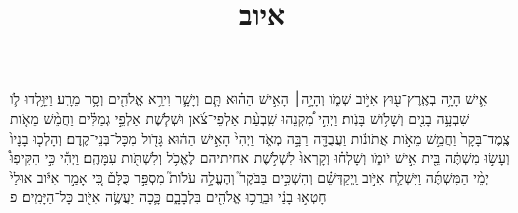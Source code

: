 \documentclass{openreader}
\title{איוב}
\date{}
\begin{document}
\maketitle
\raggedbottom 
\fontsize{16pt}{24pt}\selectfont


אִ֛ישׁ הָיָ֥ה בְאֶֽרֶץ־ע֖וּץ אִיֹּ֣וב שְׁמֹ֑ו וְהָיָ֣ה׀ הָאִ֣ישׁ הַה֗וּא תָּ֧ם וְיָשָׁ֛ר וִירֵ֥א אֱלֹהִ֖ים וְסָ֥ר מֵרָֽע׃ 
וַיִּוָּ֥לְדוּ לֹ֛ו שִׁבְעָ֥ה בָנִ֖ים וְשָׁלֹ֥ושׁ בָּנֹֽות׃ 
וַיְהִ֣י מִ֠קְנֵהוּ שִֽׁבְעַ֨ת אַלְפֵי־צֹ֜אן וּשְׁלֹ֧שֶׁת אַלְפֵ֣י גְמַלִּ֗ים וַחֲמֵ֨שׁ מֵאֹ֤ות צֶֽמֶד־בָּקָר֙ וַחֲמֵ֣שׁ מֵאֹ֣ות אֲתֹונֹ֔ות וַעֲבֻדָּ֖ה רַבָּ֣ה מְאֹ֑ד וַיְהִי֙ הָאִ֣ישׁ הַה֔וּא גָּדֹ֖ול מִכָּל־בְּנֵי־קֶֽדֶם׃ 
וְהָלְכ֤וּ בָנָיו֙ וְעָשׂ֣וּ מִשְׁתֶּ֔ה בֵּ֖ית אִ֣ישׁ יֹומֹ֑ו וְשָׁלְח֗וּ וְקָרְאוּ֙ לִשְׁלֹ֣שֶׁת אחיתיהם לֶאֱכֹ֥ל וְלִשְׁתֹּ֖ות עִמָּהֶֽם׃ 
וַיְהִ֡י כִּ֣י הִקִּיפֽוּ֩ יְמֵ֨י הַמִּשְׁתֶּ֜ה וַיִּשְׁלַ֧ח אִיֹּ֣וב וַֽיְקַדְּשֵׁ֗ם וְהִשְׁכִּ֣ים בַּבֹּקֶר֮ וְהֶעֱלָ֣ה עֹלֹות֮ מִסְפַּ֣ר כֻּלָּם֒ כִּ֚י אָמַ֣ר אִיֹּ֔וב אוּלַי֙ חָטְא֣וּ בָנַ֔י וּבֵרֲכ֥וּ אֱלֹהִ֖ים בִּלְבָבָ֑ם כָּ֛כָה יַעֲשֶׂ֥ה אִיֹּ֖וב כָּל־הַיָּמִֽים׃ פ 
\end{document}
